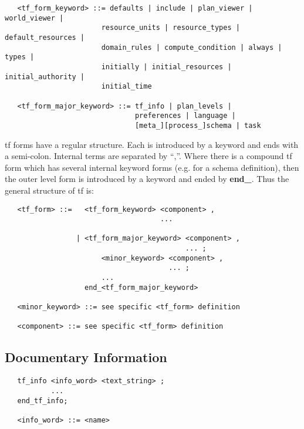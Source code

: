 \begin{verbatim}
   <tf_form_keyword> ::= defaults | include | plan_viewer | world_viewer |
                       resource_units | resource_types | default_resources |
                       domain_rules | compute_condition | always | types |
                       initially | initial_resources | initial_authority |
                       initial_time

   <tf_form_major_keyword> ::= tf_info | plan_levels |
                               preferences | language |
                               [meta_][process_]schema | task
\end{verbatim}

{\sc tf} forms have a regular structure.  Each is introduced by a
keyword and ends with a semi-colon.  Internal terms are separated by
``,''.  Where there is a compound {\sc tf} form which has several
internal keyword forms (e.g. for a schema definition), then the outer
level form is introduced by a keyword and ended by {\bf
end\_}.  Thus the general structure of {\sc tf} is:

\begin{verbatim}
   <tf_form> ::=   <tf_form_keyword> <component> ,
                                     ...

                 | <tf_form_major_keyword> <component> ,
                                           ... ;
                       <minor_keyword> <component> ,
                                       ... ;
                       ...
                   end_<tf_form_major_keyword>

   <minor_keyword> ::= see specific <tf_form> definition

   <component> ::= see specific <tf_form> definition
\end{verbatim}

\subsection{Documentary Information}
\begin{verbatim}
   tf_info <info_word> <text_string> ;
           ...
   end_tf_info;

   <info_word> ::= <name>
\end{verbatim}

